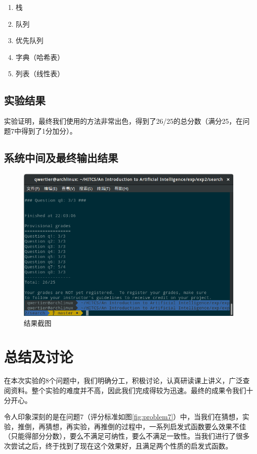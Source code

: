 \documentclass[forprint]{WHUBachelor}
\begin{document}
\begin{enumerate}
\item 栈
\item 队列
\item 优先队列
\item 字典（哈希表）
\item 列表（线性表）
\end{enumerate}

\section{实验结果}

实验证明，最终我们使用的方法非常出色，得到了26/25的总分数（满分25，在问题7中得到了1分加分）。

\section{系统中间及最终输出结果}

\begin{figure}[H]
  \centering
  \includegraphics[width=6in]{figures/result.png}
  \caption{结果截图}\label{fig:result}
\end{figure}

\chapter{总结及讨论}

在本次实验的8个问题中，我们明确分工，积极讨论，认真研读课上讲义，广泛查阅资料\cite{AI}。整个实验的难度并不高，因此我们完成得较为迅速。最终的成果令我们十分开心。

令人印象深刻的是在问题7（评分标准如图\ref{fig:problem7}）中，当我们在猜想，实验，推倒，再猜想，再实验，再推倒的过程中，一系列启发式函数要么效果不佳（只能得部分分数），要么不满足可纳性，要么不满足一致性。当我们进行了很多次尝试之后，终于找到了现在这个效果好，且满足两个性质的启发式函数。
\end{document}
